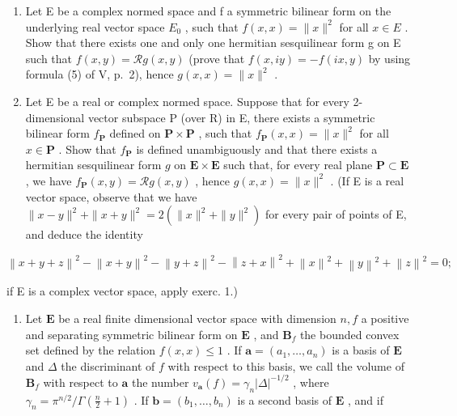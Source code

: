 \exercisegroup

\begin{enumerate}
\def\labelenumi{\arabic{enumi})}
\item
  Let E be a complex normed space and f a symmetric bilinear form on the underlying real vector space \(E_{0}\) , such that \(f(x, x) = \|x\|^{2}\) for all \(x \in E\) . Show that there exists one and only one hermitian sesquilinear form g on E such that \(f(x, y) = \mathcal{R}g(x, y)\) (prove that \(f(x, iy) = -f(ix, y)\) by using formula (5) of V, p.~2), hence \(g(x, x) = \|x\|^{2}\) .
\item
  Let E be a real or complex normed space. Suppose that for every 2-dimensional vector subspace P (over R) in E, there exists a symmetric bilinear form \(f_{\mathbf{P}}\) defined on \(\mathbf{P} \times \mathbf{P}\) , such that \(f_{\mathbf{P}}(x,x) = \| x\|^2\) for all \(x \in \mathbf{P}\) . Show that \(f_{\mathbf{P}}\) is defined unambiguously and that there exists a hermitian sesquilinear form \(g\) on \(\mathbf{E} \times \mathbf{E}\) such that, for every real plane \(\mathbf{P} \subset \mathbf{E}\) , we have \(f_{\mathbf{P}}(x,y) = \mathcal{R}g(x,y)\) , hence \(g(x,x) = \| x\|^2\) . (If E is a real vector space, observe that we have \(\| x - y\|^2 + \| x + y\|^2 = 2(\| x\|^2 + \| y\|^2)\) for every pair of points of E, and deduce the identity
\end{enumerate}

\[
\left\| x + y + z \right\| ^ {2} - \left\| x + y \right\| ^ {2} - \left\| y + z \right\| ^ {2} - \left\| z + x \right\| ^ {2} + \left\| x \right\| ^ {2} + \left\| y \right\| ^ {2} + \left\| z \right\| ^ {2} = 0;
\]

if E is a complex vector space, apply exerc. 1.)

\begin{enumerate}
\def\labelenumi{\arabic{enumi})}
\setcounter{enumi}{2}
\tightlist
\item
  Let \(\mathbf{E}\) be a real finite dimensional vector space with dimension \(n, f\) a positive and separating symmetric bilinear form on \(\mathbf{E}\) , and \(\mathbf{B}_f\) the bounded convex set defined by the relation \(f(x, x) \leqslant 1\) . If \(\mathbf{a} = (a_1, \ldots, a_n)\) is a basis of \(\mathbf{E}\) and \(\Delta\) the discriminant of \(f\) with respect to this basis, we call the volume of \(\mathbf{B}_f\) with respect to \(\mathbf{a}\) the number \(v_{\mathbf{a}}(f) = \gamma_n |\Delta|^{-1/2}\) , where \(\gamma_n = \pi^{n/2} / \Gamma\left(\frac{n}{2} + 1\right)\) . If \(\mathbf{b} = (b_1, \ldots, b_n)\) is a second basis of \(\mathbf{E}\) , and if
\end{enumerate}

